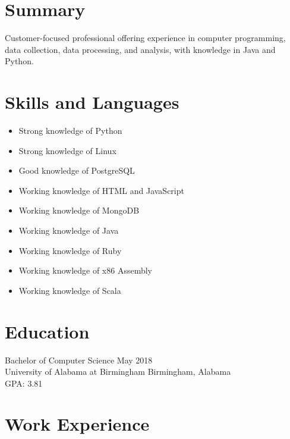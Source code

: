 \documentclass[10pt]{setzer_resume}
\begin{document}


  \section{Summary}
  Customer-focused professional offering experience in computer programming, data collection, data processing, and analysis, with knowledge in Java and Python.

  \section{Skills and Languages}

  {
  \setlength\multicolsep{0pt}
  \begin{multicols}{2}
    \noindent
    \begin{itemize}[nosep]
      \item Strong knowledge of Python
      \item Strong knowledge of Linux
      \item Good knowledge of PostgreSQL
      \item Working knowledge of HTML and JavaScript
      \item Working knowledge of MongoDB
      \item Working knowledge of Java
      \item Working knowledge of Ruby
      \item Working knowledge of x86 Assembly
      \item Working knowledge of Scala
    \end{itemize}
  \end{multicols}
  }

  \section{Education}
  Bachelor of Computer Science \hfill May 2018 \\
  University of Alabama at Birmingham \hfill Birmingham, Alabama \\
  GPA\@: 3.81

  \section{Work Experience}

\end{document}
